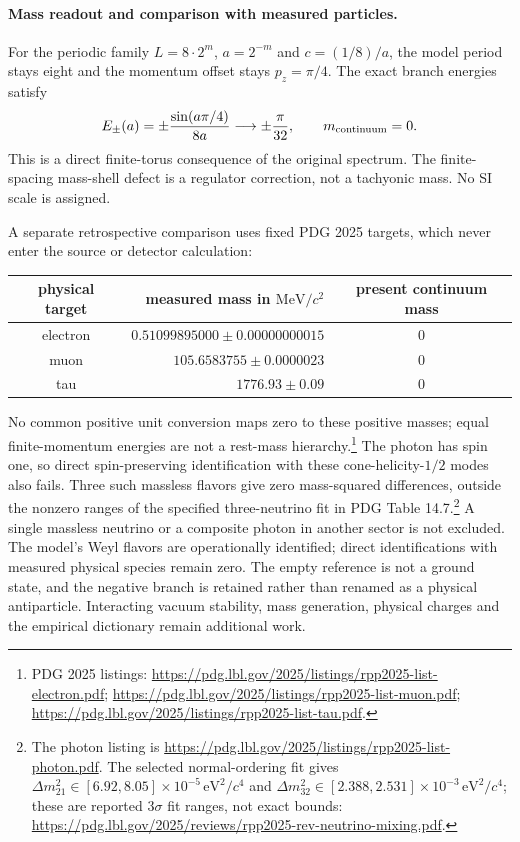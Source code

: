 \paragraph{Mass readout and comparison with measured particles.}
For the periodic family $L=8\cdot2^m$, $a=2^{-m}$ and
$c=(1/8)/a$, the model period stays eight and the momentum offset stays
$p_z=\pi/4$.  The exact branch energies satisfy
\[
 E_\pm(a)=\pm\frac{\sin(a\pi/4)}{8a}
       \longrightarrow\pm\frac{\pi}{32},
 \qquad m_{\rm continuum}=0.
\]
This is a direct finite-torus consequence of the original spectrum.
The finite-spacing mass-shell defect is a regulator correction, not
a tachyonic mass.  No SI scale is assigned.

A separate retrospective comparison uses fixed PDG 2025 targets, which
never enter the source or detector calculation:
\begin{center}
\begin{tabular}{c r c}
physical target & measured mass in $\mathrm{MeV}/c^2$
                & present continuum mass\\\hline
electron & $0.51099895000\pm0.00000000015$ & 0\\
muon & $105.6583755\pm0.0000023$ & 0\\
tau & $1776.93\pm0.09$ & 0
\end{tabular}
\end{center}
No common positive unit conversion maps zero to these positive masses;
equal finite-momentum energies are not a rest-mass hierarchy.\footnote{PDG
2025 listings:
\url{https://pdg.lbl.gov/2025/listings/rpp2025-list-electron.pdf};
\url{https://pdg.lbl.gov/2025/listings/rpp2025-list-muon.pdf};
\url{https://pdg.lbl.gov/2025/listings/rpp2025-list-tau.pdf}.}
The photon has spin one, so direct spin-preserving identification with
these cone-helicity-$1/2$ modes also fails.  Three such massless flavors
give zero mass-squared differences, outside the nonzero ranges of the
specified three-neutrino fit in PDG Table 14.7.\footnote{The photon
listing is \url{https://pdg.lbl.gov/2025/listings/rpp2025-list-photon.pdf}.
The selected normal-ordering fit gives
$\Delta m_{21}^2\in[6.92,8.05]\times10^{-5}\,\mathrm{eV}^2/c^4$ and
$\Delta m_{32}^2\in[2.388,2.531]\times10^{-3}\,\mathrm{eV}^2/c^4$;
these are reported $3\sigma$ fit ranges, not exact bounds:
\url{https://pdg.lbl.gov/2025/reviews/rpp2025-rev-neutrino-mixing.pdf}.}
A single massless neutrino or a composite photon in another sector is
not excluded.  The model's Weyl flavors are operationally identified;
direct identifications with measured physical species remain zero.
The empty reference is not a ground state, and the negative branch is
retained rather than renamed as a physical antiparticle.  Interacting
vacuum stability, mass generation, physical charges and the empirical
dictionary remain additional work.
